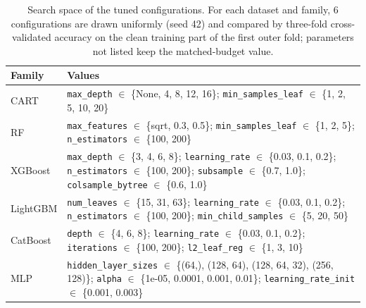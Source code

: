 \documentclass[pdflatex,sn-mathphys]{sn-jnl}
\theoremstyle{thmstyleone}
\begin{document}
\begin{table}[t]
\centering
\footnotesize
\caption{Search space of the tuned configurations. For each dataset and family, 6 configurations are drawn uniformly (seed 42) and compared by three-fold cross-validated accuracy on the clean training part of the first outer fold; parameters not listed keep the matched-budget value.}
\label{tab:search}
\begin{tabular}{@{}lp{9.5cm}@{}}
\toprule
Family & Values \\
\midrule
CART & \texttt{max\_depth} $\in$ \{None, 4, 8, 12, 16\}; \texttt{min\_samples\_leaf} $\in$ \{1, 2, 5, 10, 20\} \\
RF & \texttt{max\_features} $\in$ \{sqrt, 0.3, 0.5\}; \texttt{min\_samples\_leaf} $\in$ \{1, 2, 5\}; \texttt{n\_estimators} $\in$ \{100, 200\} \\
XGBoost & \texttt{max\_depth} $\in$ \{3, 4, 6, 8\}; \texttt{learning\_rate} $\in$ \{0.03, 0.1, 0.2\}; \texttt{n\_estimators} $\in$ \{100, 200\}; \texttt{subsample} $\in$ \{0.7, 1.0\}; \texttt{colsample\_bytree} $\in$ \{0.6, 1.0\} \\
LightGBM & \texttt{num\_leaves} $\in$ \{15, 31, 63\}; \texttt{learning\_rate} $\in$ \{0.03, 0.1, 0.2\}; \texttt{n\_estimators} $\in$ \{100, 200\}; \texttt{min\_child\_samples} $\in$ \{5, 20, 50\} \\
CatBoost & \texttt{depth} $\in$ \{4, 6, 8\}; \texttt{learning\_rate} $\in$ \{0.03, 0.1, 0.2\}; \texttt{iterations} $\in$ \{100, 200\}; \texttt{l2\_leaf\_reg} $\in$ \{1, 3, 10\} \\
MLP & \texttt{hidden\_layer\_sizes} $\in$ \{(64,), (128, 64), (128, 64, 32), (256, 128)\}; \texttt{alpha} $\in$ \{1e-05, 0.0001, 0.001, 0.01\}; \texttt{learning\_rate\_init} $\in$ \{0.001, 0.003\} \\
\bottomrule
\end{tabular}
\end{table}
\end{document}

